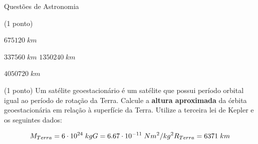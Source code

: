 \documentclass{../lista}
\begin{document}
\begin{secao}{Questões de Astronomia}
\begin{questao}{(1 ponto)}
			
			\begin{alternativas}
				\item $675120 \; km$
				\item $337560 \; km$
				\alternativaMarcada $1350240 \; km$
				\item $4050720 \; km$
			\end{alternativas}
			
		\end{questao}
		\begin{questao}{(1 ponto)}
			Um satélite geoestacionário é um satélite que possui período orbital igual ao período de rotação da Terra. Calcule a \textbf{altura aproximada} da órbita geoestacionária em relação à superfície da Terra. Utilize a terceira lei de Kepler e os seguintes dados:
			
			\begin{equation}
				M_{Terra} = 6 \cdot 10^{24} \; kg \\
				G = 6.67 \cdot 10^{-11} \; N m^{2} / kg^{2} \\
				R_{Terra} = 6371 \; km
			\end{equation}
			

\end{questao}
\end{secao}
\end{document}
